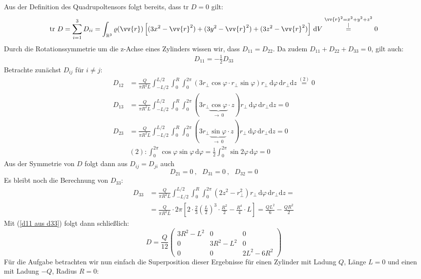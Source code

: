 \documentclass[a4paper,12pt]{article}
\begin{document}
Aus der Definition des Quadrupoltensors folgt bereits, dass $\textrm{tr }D=0$ gilt:
$$\textrm{tr }D=\sum_{i=1}^3D_{ii}=\int_{\mathbb{R}^3}\varrho(\vv{r})\left[(3x^2-\vv{r}^2)+(3y^2-\vv{r}^2)+(3z^2-\vv{r}^2)\right]\,\textrm{d}V\overset{\substack{\vv{r}^2=x^2+y^2+z^2\\|}}{=}0 $$
Durch die Rotationssymmetrie um die z-Achse eines Zylinders wissen wir, dass $D_{11}=D_{22}$. Da zudem $D_{11}+D_{22}+D_{33}=0$, gilt auch:
\begin{align*}
D_{11}=-\frac{1}{2}D_{33} \label{d11 aus d33}\tag{1}
\end{align*} 
Betrachte zunächst $D_{ij}$ für $i\neq j$:
\begin{align*}
D_{12}&=\frac{Q}{\pi R^2L}\int_{-L/2}^{L/2}\int_0^{R}\int_0^{2\pi}(3r_\bot\cos\varphi\cdot r_\bot\sin\varphi)r_\bot\,\textrm{d}\varphi\,\textrm{d}r_\bot\textrm{d}z\overset{(2)}{=}0\\
D_{13}&=\frac{Q}{\pi R^2L}\int_{-L/2}^{L/2}\int_0^{R}\int_0^{2\pi}(3r_\bot\underbrace{\cos\varphi}_{\longrightarrow\ 0}\cdot z)r_\bot\,\textrm{d}\varphi\,\textrm{d}r_\bot\textrm{d}z=0 \\
D_{23}&= \frac{Q}{\pi R^2L}\int_{-L/2}^{L/2}\int_0^{R}\int_0^{2\pi}(3r_\bot\underbrace{\sin\varphi}_{\longrightarrow\ 0}\cdot z)r_\bot\,\textrm{d}\varphi\,\textrm{d}r_\bot\textrm{d}z=0\\
&(2):\int_0^{2\pi}\cos\varphi\sin\varphi\,\textrm{d}\varphi=\frac{1}{2}\int_0^{2\pi}\sin 2\varphi\, \textrm{d}\varphi=0
\end{align*}
Aus der Symmetrie von $D$ folgt dann aus $D_{ij}=D_{ji}$ auch $$D_{21}=0\ ,\ \ \ D_{31}=0\ ,\ \ \ D_{32}=0$$
Es bleibt noch die Berechnung von $D_{33}$:
\begin{align*}
D_{33}&=\frac{Q}{\pi R^2L}\int_{-L/2}^{L/2}\int_0^{R}\int_0^{2\pi}(2z^2-r_\bot^2)r_\bot\,\textrm{d}\varphi\,\textrm{d}r_\bot\textrm{d}z=\\
&=\frac{Q}{\pi R^2L}\cdot 2\pi\left[2\cdot\frac{2}{3}\left(\frac{L}{2}\right)^3\cdot\frac{R^2}{2}-\frac{R^4}{4}\cdot L\right]=\frac{QL^2}{6}-\frac{QR^2}{2} \label{d33}\tag{3}
\end{align*} 
Mit (\ref{d11 aus d33}) folgt dann schließlich:
$$D=\frac{Q}{12}\begin{pmatrix}3R^2-L^2&0&0\\ 0 & 3R^2-L^2 & 0 \\ 0 & 0 & 2L^2-6R^2\end{pmatrix}$$
Für die Aufgabe betrachten wir nun einfach die Superposition dieser Ergebnisse für einen Zylinder mit Ladung $Q$, Länge $L=0$ und einen mit Ladung $-Q$, Radius $R=0$:
\end{document}
